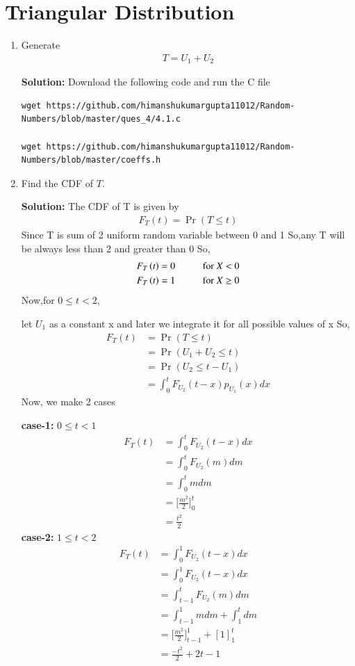 \documentclass[journal,12pt,twocolumn]{IEEEtran}
\renewcommand\thesection{\arabic{section}}
\providecommand{\pr}[1]{\ensuremath{\Pr\left(#1\right)}}
\providecommand{\brak}[1]{\ensuremath{\left(#1\right)}}
\theoremstyle{remark}
\newcommand{\solution}{\noindent \textbf{Solution: }}
\numberwithin{equation}{section}
\begin{document}
\section{Triangular Distribution}
\begin{enumerate}[label=\thesection.\arabic*
,ref=\thesection.\theenumi]
%
\item Generate 
	\begin{align}
		T = U_1+U_2
	\end{align}

\solution Download the following code and run the C file
\begin{lstlisting}
wget https://github.com/himanshukumargupta11012/Random-Numbers/blob/master/ques_4/4.1.c

wget https://github.com/himanshukumargupta11012/Random-Numbers/blob/master/coeffs.h	
\end{lstlisting}
\item Find the CDF of $T$.

\solution
The CDF of T is given by
\begin{align}
	F_T\brak{t}=\pr{T\leq t}
\end{align}
Since T is sum of 2 uniform random variable between 0 and 1 
So,any T will be always less than 2 and greater than 0
So,
\begin{align}
	F_T\brak{t}=0 \hspace{10mm} \text{for $X<0$}\\
	F_T\brak{t}=1 \hspace{10mm} \text{for $X\geq0$}
\end{align}
Now,for $0\leq t<2$,

let $U_1$ as a constant x and later we integrate it for all possible values of x
So,
\begin{align}
	F_T\brak{t}&=\pr{T\leq t}\\
	&=\pr{U_1+U_2\leq t}\\
&=\pr{U_2\leq t-U_1}\\
&=\int_0^t F_{U_2}\brak{t-x} p_{U_1}\brak{x}dx
\end{align}
Now, we make 2 cases


\textbf{case-1:} $0\leq t<1$
\begin{align}
	F_T\brak{t}&=\int_0^t F_{U_2}\brak{t-x}dx\\
	&=\int_0^t F_{U_2}\brak{m}dm\\
	&=\int_0^t mdm\\
	&=\bigg[\frac{m^2}{2}\bigg]_0^t\\
	&=\frac{t^2}{2}
\end{align}
\textbf{case-2:} $1\leq t<2$
\begin{align}
	F_T\brak{t}&=\int_0^1 F_{U_2}\brak{t-x}dx\\
	&=\int_0^1 F_{U_2}\brak{t-x}dx\\
	&=\int_{t-1}^t F_{U_2}\brak{m}dm\\
	&=\int_{t-1}^1 mdm+\int_1^t dm\\
	&=\bigg[\frac{m^2}{2}\bigg]_{t-1}^1+[1]_1^t\\
	&=\frac{-t^2}{2}+2t-1	
\end{align}


\end{enumerate}
\end{document}
